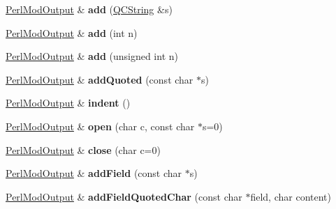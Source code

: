 \begin{DoxyCompactItemize}
\item 
\hypertarget{class_perl_mod_output_af495cf877dfa0970184e0c9e2397fa8a}{\hyperlink{class_perl_mod_output}{Perl\-Mod\-Output} \& {\bfseries add} (\hyperlink{class_q_c_string}{Q\-C\-String} \&s)}\label{class_perl_mod_output_af495cf877dfa0970184e0c9e2397fa8a}

\item 
\hypertarget{class_perl_mod_output_a668af61a8b52a089029bc3fcde91c0be}{\hyperlink{class_perl_mod_output}{Perl\-Mod\-Output} \& {\bfseries add} (int n)}\label{class_perl_mod_output_a668af61a8b52a089029bc3fcde91c0be}

\item 
\hypertarget{class_perl_mod_output_a3b86dcf5320ecb02095b770f5f0090f8}{\hyperlink{class_perl_mod_output}{Perl\-Mod\-Output} \& {\bfseries add} (unsigned int n)}\label{class_perl_mod_output_a3b86dcf5320ecb02095b770f5f0090f8}

\item 
\hypertarget{class_perl_mod_output_a6837b1de4e867b7458110ee0c4ebbdce}{\hyperlink{class_perl_mod_output}{Perl\-Mod\-Output} \& {\bfseries add\-Quoted} (const char $\ast$s)}\label{class_perl_mod_output_a6837b1de4e867b7458110ee0c4ebbdce}

\item 
\hypertarget{class_perl_mod_output_a0b1aac2076a2cab020425654822d1b5c}{\hyperlink{class_perl_mod_output}{Perl\-Mod\-Output} \& {\bfseries indent} ()}\label{class_perl_mod_output_a0b1aac2076a2cab020425654822d1b5c}

\item 
\hypertarget{class_perl_mod_output_adab620ab808a85d0635f1b643d05c4cb}{\hyperlink{class_perl_mod_output}{Perl\-Mod\-Output} \& {\bfseries open} (char c, const char $\ast$s=0)}\label{class_perl_mod_output_adab620ab808a85d0635f1b643d05c4cb}

\item 
\hypertarget{class_perl_mod_output_a59c991bb0a0d65b6a4941f7a8d341fe5}{\hyperlink{class_perl_mod_output}{Perl\-Mod\-Output} \& {\bfseries close} (char c=0)}\label{class_perl_mod_output_a59c991bb0a0d65b6a4941f7a8d341fe5}

\item 
\hypertarget{class_perl_mod_output_aa3f2524f232b457c963797ce34da8d3e}{\hyperlink{class_perl_mod_output}{Perl\-Mod\-Output} \& {\bfseries add\-Field} (const char $\ast$s)}\label{class_perl_mod_output_aa3f2524f232b457c963797ce34da8d3e}

\item 
\hypertarget{class_perl_mod_output_abe1f25ffed26ea8634c267e513497b94}{\hyperlink{class_perl_mod_output}{Perl\-Mod\-Output} \& {\bfseries add\-Field\-Quoted\-Char} (const char $\ast$field, char content)}\label{class_perl_mod_output_abe1f25ffed26ea8634c267e513497b94}


\end{DoxyCompactItemize}
